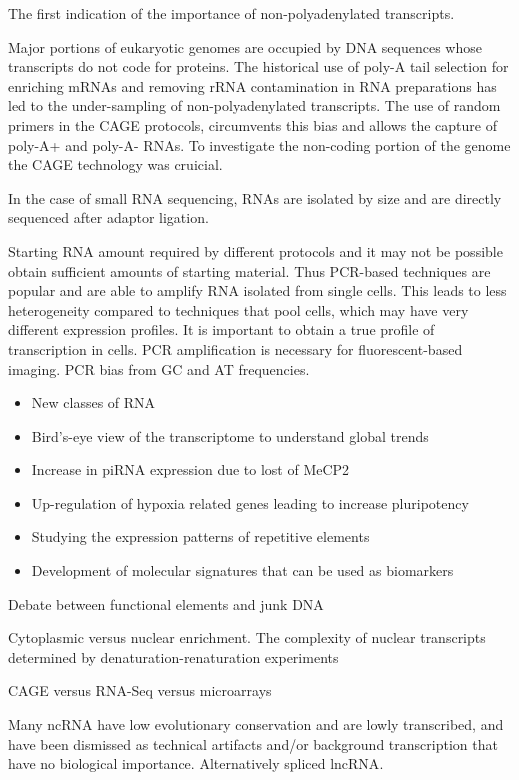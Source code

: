 The first indication of the importance of non-polyadenylated transcripts\cite{pmid4213457}.

Major portions of eukaryotic genomes are occupied by DNA sequences whose transcripts do not code for proteins. The historical use of poly-A tail selection for enriching mRNAs and removing rRNA contamination in RNA preparations has led to the under-sampling of non-polyadenylated transcripts. The use of random primers in the CAGE protocols, circumvents this bias and allows the capture of poly-A+ and poly-A- RNAs. To investigate the non-coding portion of the genome the CAGE technology was cruicial.

In the case of small RNA sequencing, RNAs are isolated by size and are directly sequenced after adaptor ligation.

Starting RNA amount required by different protocols and it may not be possible obtain sufficient amounts of starting material. Thus PCR-based techniques are popular and are able to amplify RNA isolated from single cells. This leads to less heterogeneity compared to techniques that pool cells, which may have very different expression profiles. It is important to obtain a true profile of transcription in cells. PCR amplification is necessary for fluorescent-based imaging. PCR bias from GC and AT frequencies.

\begin{itemize}
   \item New classes of RNA
   \item Bird’s-eye view of the transcriptome to understand global trends
   \item Increase in piRNA expression due to lost of MeCP2
   \item Up-regulation of hypoxia related genes leading to increase pluripotency
   \item Studying the expression patterns of repetitive elements
   \item Development of molecular signatures that can be used as biomarkers
\end{itemize}

Debate between functional elements and junk DNA

Cytoplasmic versus nuclear enrichment. The complexity of nuclear transcripts determined by denaturation-renaturation experiments\cite{pmid5969070}

CAGE versus RNA-Seq versus microarrays\cite{pmid24676093}

Many ncRNA have low evolutionary conservation and are lowly transcribed, and have been dismissed as technical artifacts and/or background transcription that have no biological importance. Alternatively spliced lncRNA\cite{Johnsson2013}.

